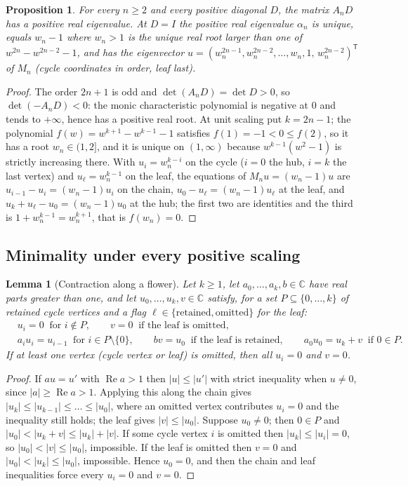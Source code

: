 \documentclass[11pt,a4paper]{article}
\theoremstyle{plain}
\newtheorem{proposition}[theorem]{Proposition}
\newtheorem{lemma}[theorem]{Lemma}
\theoremstyle{definition}
\theoremstyle{remark}
\newcommand{\C}{\mathbb C}
\newcommand{\T}{\mathsf T}
\DeclareMathOperator{\Ree}{Re}
\begin{document}
\begin{proposition}\label{prop:posunstable}
For every $n\ge2$ and every positive diagonal $D$, the matrix $A_nD$ has a positive real eigenvalue. At $D=I$ the positive real eigenvalue $\alpha_n$ is unique, equals $w_n-1$ where $w_n>1$ is the unique real root larger than one of $w^{2n}-w^{2n-2}-1$, and has the eigenvector $u=(w_n^{2n-1},w_n^{2n-2},\dots,w_n,1,\,w_n^{2n-2})^{\T}$ of $M_n$ (cycle coordinates in order, leaf last).
\end{proposition}
\begin{proof}
The order $2n+1$ is odd and $\det(A_nD)=\det D>0$, so $\det(-A_nD)<0$: the monic characteristic polynomial is negative at $0$ and tends to $+\infty$, hence has a positive real root. At unit scaling put $k=2n-1$; the polynomial $f(w)=w^{k+1}-w^{k-1}-1$ satisfies $f(1)=-1<0\le f(2)$, so it has a root $w_n\in(1,2]$, and it is unique on $(1,\infty)$ because $w^{k-1}(w^2-1)$ is strictly increasing there. With $u_i=w_n^{k-i}$ on the cycle ($i=0$ the hub, $i=k$ the last vertex) and $u_\ell=w_n^{k-1}$ on the leaf, the equations of $M_nu=(w_n-1)u$ are $u_{i-1}-u_i=(w_n-1)u_i$ on the chain, $u_0-u_\ell=(w_n-1)u_\ell$ at the leaf, and $u_k+u_\ell-u_0=(w_n-1)u_0$ at the hub; the first two are identities and the third is $1+w_n^{k-1}=w_n^{k+1}$, that is $f(w_n)=0$.
\end{proof}

\subsection{Minimality under every positive scaling}

\begin{lemma}[Contraction along a flower]\label{lem:contraction}
Let $k\ge1$, let $a_0,\dots,a_k,b\in\C$ have real parts greater than one, and let $u_0,\dots,u_k,v\in\C$ satisfy, for a set $P\subseteq\{0,\dots,k\}$ of retained cycle vertices and a flag $\ell\in\{\text{retained},\text{omitted}\}$ for the leaf:
\begin{align*}
&u_i=0\ \text{ for } i\notin P,\qquad v=0\ \text{ if the leaf is omitted},\\
&a_iu_i=u_{i-1}\ \text{ for } i\in P\setminus\{0\},\qquad bv=u_0\ \text{ if the leaf is retained},\qquad a_0u_0=u_k+v\ \text{ if } 0\in P .
\end{align*}
If at least one vertex (cycle vertex or leaf) is omitted, then all $u_i=0$ and $v=0$.
\end{lemma}
\begin{proof}
If $au=u'$ with $\Ree a>1$ then $|u|\le|u'|$ with strict inequality when $u\neq0$, since $|a|\ge\Ree a>1$. Applying this along the chain gives $|u_k|\le|u_{k-1}|\le\dots\le|u_0|$, where an omitted vertex contributes $u_i=0$ and the inequality still holds; the leaf gives $|v|\le|u_0|$. Suppose $u_0\ne0$; then $0\in P$ and $|u_0|<|u_k+v|\le|u_k|+|v|$. If some cycle vertex $i$ is omitted then $|u_k|\le|u_i|=0$, so $|u_0|<|v|\le|u_0|$, impossible. If the leaf is omitted then $v=0$ and $|u_0|<|u_k|\le|u_0|$, impossible. Hence $u_0=0$, and then the chain and leaf inequalities force every $u_i=0$ and $v=0$.
\end{proof}
\end{document}
